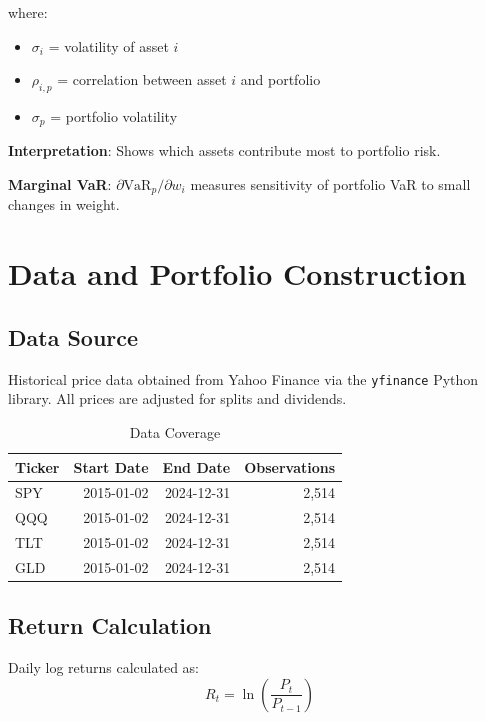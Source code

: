 \documentclass[12pt,a4paper]{article}
\begin{document}
where:
\begin{itemize}
    \item $\sigma_i$ = volatility of asset $i$
    \item $\rho_{i,p}$ = correlation between asset $i$ and portfolio
    \item $\sigma_p$ = portfolio volatility
\end{itemize}

\textbf{Interpretation}: Shows which assets contribute most to portfolio risk.

\textbf{Marginal VaR}: $\partial \text{VaR}_p / \partial w_i$ measures sensitivity of portfolio VaR to small changes in weight.

\newpage
\section{Data and Portfolio Construction}

\subsection{Data Source}

Historical price data obtained from Yahoo Finance via the \texttt{yfinance} Python library. All prices are adjusted for splits and dividends.

\begin{table}[H]
\centering
\begin{tabular}{@{}lrrr@{}}
\toprule
\textbf{Ticker} & \textbf{Start Date} & \textbf{End Date} & \textbf{Observations} \\ \midrule
SPY & 2015-01-02 & 2024-12-31 & 2,514 \\
QQQ & 2015-01-02 & 2024-12-31 & 2,514 \\
TLT & 2015-01-02 & 2024-12-31 & 2,514 \\
GLD & 2015-01-02 & 2024-12-31 & 2,514 \\ \bottomrule
\end{tabular}
\caption{Data Coverage}
\end{table}

\subsection{Return Calculation}

Daily log returns calculated as:
\begin{equation}
R_t = \ln\left(\frac{P_t}{P_{t-1}}\right)
\end{equation}
\end{document}
